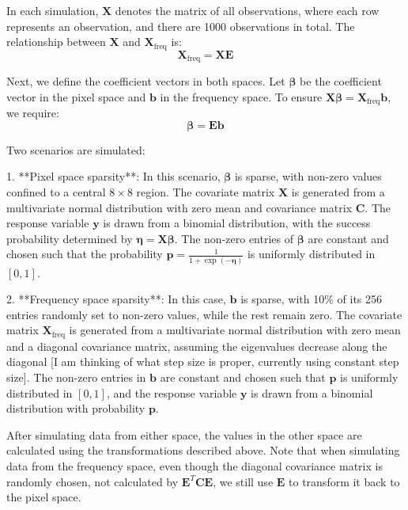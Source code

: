 \documentclass[12pt]{article}
\begin{document}
In each simulation, \( \mathbf{X} \) denotes the matrix of all observations, where each row represents an observation, and there are 1000 observations in total. The relationship between \( \mathbf{X} \) and \( \mathbf{X}_{\mathrm{freq}} \) is:
\[
\mathbf{X}_{\mathrm{freq}} = \mathbf{X} \mathbf{E}
\]

Next, we define the coefficient vectors in both spaces. Let \( \boldsymbol{\beta} \) be the coefficient vector in the pixel space and \( \mathbf{b} \) in the frequency space. To ensure \( \mathbf{X} \boldsymbol{\beta} = \mathbf{X}_{\mathrm{freq}} \mathbf{b} \), we require:
\[
\boldsymbol{\beta} = \mathbf{E} \mathbf{b}
\]

Two scenarios are simulated:

1. **Pixel space sparsity**: In this scenario, \( \boldsymbol{\beta} \) is sparse, with non-zero values confined to a central \( 8 \times 8 \) region. The covariate matrix \( \mathbf{X} \) is generated from a multivariate normal distribution with zero mean and covariance matrix \( \mathbf{C} \). The response variable \( \mathbf{y} \) is drawn from a binomial distribution, with the success probability determined by \( \boldsymbol{\eta} = \mathbf{X} \boldsymbol{\beta} \). The non-zero entries of \( \boldsymbol{\beta} \) are constant and chosen such that the probability \( \mathbf{p} = \frac{1}{1 + \exp(-\boldsymbol{\eta})} \) is uniformly distributed in \( [0, 1] \).

2. **Frequency space sparsity**: In this case, \( \mathbf{b} \) is sparse, with 10\% of its 256 entries randomly set to non-zero values, while the rest remain zero. The covariate matrix \( \mathbf{X}_{\mathrm{freq}} \) is generated from a multivariate normal distribution with zero mean and a diagonal covariance matrix, assuming the eigenvalues decrease along the diagonal [I am thinking of what step size is proper, currently using constant step size]. The non-zero entries in \( \mathbf{b} \) are constant and chosen such that \( \mathbf{p} \) is uniformly distributed in \( [0, 1] \), and the response variable \( \mathbf{y} \) is drawn from a binomial distribution with probability \( \mathbf{p} \).

After simulating data from either space, the values in the other space are calculated using the transformations described above. Note that when simulating data from the frequency space, even though the diagonal covariance matrix is randomly chosen, not calculated by \( \mathbf{E}^T \mathbf{C} \mathbf{E} \), we still use \( \mathbf{E} \) to transform it back to the pixel space.
\end{document}
